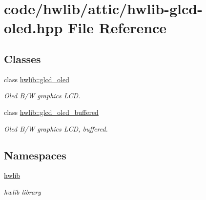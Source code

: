 \hypertarget{attic_2hwlib-glcd-oled_8hpp}{}\section{code/hwlib/attic/hwlib-\/glcd-\/oled.hpp File Reference}
\label{attic_2hwlib-glcd-oled_8hpp}
\subsection*{Classes}
\begin{DoxyCompactItemize}
\item 
class \hyperlink{classhwlib_1_1glcd__oled}{hwlib\+::glcd\+\_\+oled}
\begin{DoxyCompactList}\small\item\em Oled B/W graphics L\+CD. \end{DoxyCompactList}\item 
class \hyperlink{classhwlib_1_1glcd__oled__buffered}{hwlib\+::glcd\+\_\+oled\+\_\+buffered}
\begin{DoxyCompactList}\small\item\em Oled B/W graphics L\+CD, buffered. \end{DoxyCompactList}\end{DoxyCompactItemize}
\subsection*{Namespaces}
\begin{DoxyCompactItemize}
\item 
 \hyperlink{namespacehwlib}{hwlib}
\begin{DoxyCompactList}\small\item\em hwlib library \end{DoxyCompactList}\end{DoxyCompactItemize}
